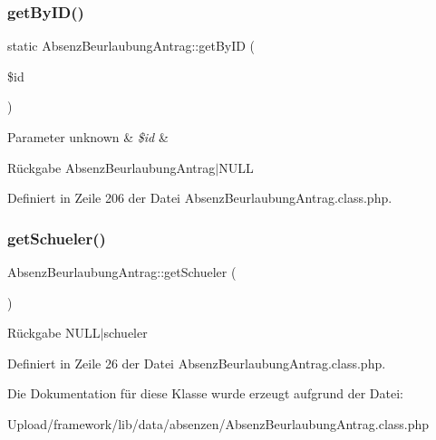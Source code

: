 \mbox{\label{class_absenz_beurlaubung_antrag_ae7b7d21c79f140d4bebc067965003a79}} 
\subsubsection{\texorpdfstring{get\+By\+I\+D()}{getByID()}}
{\footnotesize\ttfamily static Absenz\+Beurlaubung\+Antrag\+::get\+By\+ID (\begin{DoxyParamCaption}\item[{}]{\$id }\end{DoxyParamCaption})\hspace{0.3cm}{\ttfamily [static]}}


\begin{DoxyParams}[1]{Parameter}
unknown & {\em \$id} & \\
\hline
\end{DoxyParams}
\begin{DoxyReturn}{Rückgabe}
Absenz\+Beurlaubung\+Antrag$\vert$\+N\+U\+LL 
\end{DoxyReturn}


Definiert in Zeile 206 der Datei Absenz\+Beurlaubung\+Antrag.\+class.\+php.

\mbox{\label{class_absenz_beurlaubung_antrag_a86cdc543989ecd75267bb9cbe9c76b48}} 
\subsubsection{\texorpdfstring{get\+Schueler()}{getSchueler()}}
{\footnotesize\ttfamily Absenz\+Beurlaubung\+Antrag\+::get\+Schueler (\begin{DoxyParamCaption}{ }\end{DoxyParamCaption})}

\begin{DoxyReturn}{Rückgabe}
N\+U\+L\+L$\vert$schueler 
\end{DoxyReturn}


Definiert in Zeile 26 der Datei Absenz\+Beurlaubung\+Antrag.\+class.\+php.



Die Dokumentation für diese Klasse wurde erzeugt aufgrund der Datei\+:\begin{DoxyCompactItemize}
\item 
Upload/framework/lib/data/absenzen/Absenz\+Beurlaubung\+Antrag.\+class.\+php\end{DoxyCompactItemize}
